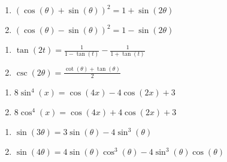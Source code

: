 \begin{multicols}{2}

\begin{enumerate}

\setcounter{enumi}{\value{HW}}

\item  $(\cos(\theta) + \sin(\theta))^2 = 1 + \sin(2\theta)$ \label{moreidentfirst}
\item  $(\cos(\theta) - \sin(\theta))^2 = 1 - \sin(2\theta)$

\setcounter{HW}{\value{enumi}}

\end{enumerate}

\end{multicols}

\begin{multicols}{2}

\begin{enumerate}

\setcounter{enumi}{\value{HW}}

\item  $\tan(2t) = \frac{1}{1-\tan(t)} - \frac{1}{1+\tan(t)}$
\item  $\csc(2\theta) = \frac{\cot(\theta) + \tan(\theta)}{2}$

\setcounter{HW}{\value{enumi}}

\end{enumerate}

\end{multicols}

\begin{multicols}{2}

\begin{enumerate}

\setcounter{enumi}{\value{HW}}

\item  $8 \sin^{4}(x) = \cos(4x) - 4\cos(2x)+3$
\item  $8 \cos^{4}(x) = \cos(4x) + 4\cos(2x)+3$

\setcounter{HW}{\value{enumi}}

\end{enumerate}

\end{multicols}

\begin{multicols}{2}

\begin{enumerate}

\setcounter{enumi}{\value{HW}}

\item \label{sine3theta} $\sin(3\theta) = 3\sin(\theta) - 4\sin^{3}(\theta)$
\item  $\sin(4\theta) = 4\sin(\theta)\cos^{3}(\theta) - 4\sin^{3}(\theta)\cos(\theta)$

\setcounter{HW}{\value{enumi}}

\end{enumerate}

\end{multicols}


